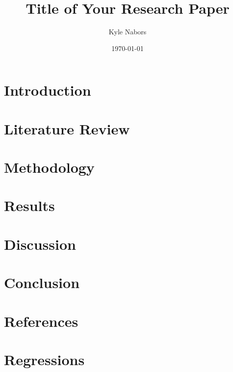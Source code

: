 \documentclass{article}
\begin{document}
\title{Title of Your Research Paper}
\author{Kyle Nabors}
\date{\today}

\maketitle

\section{Introduction}

\section{Literature Review}

\section{Methodology}

\section{Results}

\section{Discussion}

\section{Conclusion}

\section{References}



\section{Regressions}
\end{document}
